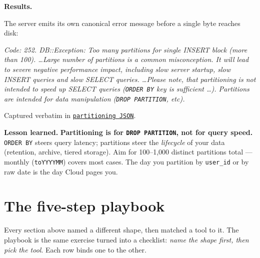 \documentclass[11pt]{article}
\newcommand{\resultsHd}{%
  \par\smallskip\noindent\textbf{\color{accentblue}Results.}\par\nopagebreak\smallskip}
\newcommand{\lesson}[1]{%
  \par\medskip
  \begin{lessonbox}\textbf{\color{accentgreen}Lesson learned.}\enspace #1\end{lessonbox}}
\begin{document}
\resultsHd
The server emits its own canonical error message before a single
byte reaches disk:

\begin{tcolorbox}[colback=accentred!8, colframe=accentred,
                  boxrule=0pt, leftrule=3pt, arc=2pt,
                  left=10pt, right=10pt, top=4pt, bottom=4pt,
                  enhanced jigsaw, fontupper=\small]
\textit{Code: 252. DB::Exception: Too many partitions for single INSERT
block (more than 100). \ldots Large number of partitions is a common
misconception. It will lead to severe negative performance impact,
including slow server startup, slow INSERT queries and slow SELECT
queries. \ldots Please note, that partitioning is not intended to speed
up SELECT queries (\texttt{ORDER BY} key is sufficient \ldots).
Partitions are intended for data manipulation
(\texttt{DROP PARTITION}, etc).}
\end{tcolorbox}

\smallskip
Captured verbatim in
\href{run:results/compare_features_20260503_191740.json}{\texttt{partitioning JSON}}.

\lesson{%
\textbf{Partitioning is for \texttt{DROP PARTITION}, not for query
speed.} \texttt{ORDER BY} steers query latency; partitions steer the
\emph{lifecycle} of your data (retention, archive, tiered storage).
Aim for 100--1{,}000 distinct partitions total --- monthly
(\texttt{toYYYYMM}) covers most cases. The day you partition by
\texttt{user\_id} or by raw date is the day Cloud pages you.}

\section*{The five-step playbook}

Every section above named a different shape, then matched a tool to
it. The playbook is the same exercise turned into a checklist:
\emph{name the shape first, then pick the tool}. Each row binds one
to the other.
\end{document}
